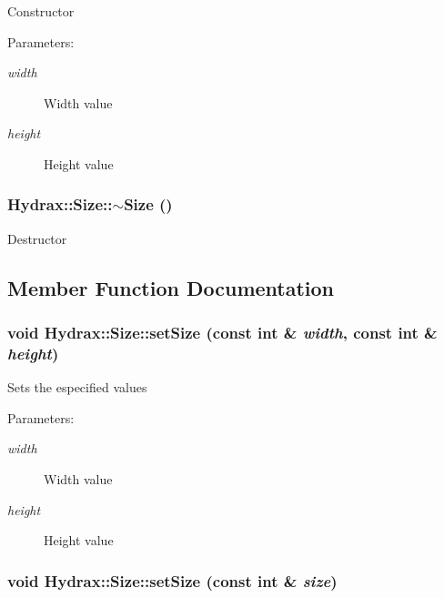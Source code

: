Constructor \begin{Desc}
\item[Parameters:]
\begin{description}
\item[{\em width}]Width value \item[{\em height}]Height value \end{description}
\end{Desc}
\hypertarget{struct_hydrax_1_1_size_ace8e593f9b2c5f6672f401ba86a2df9}{
\subsubsection[{$\sim$Size}]{\setlength{\rightskip}{0pt plus 5cm}Hydrax::Size::$\sim$Size ()}}
\label{struct_hydrax_1_1_size_ace8e593f9b2c5f6672f401ba86a2df9}


Destructor 

\subsection{Member Function Documentation}
\hypertarget{struct_hydrax_1_1_size_a8ab07e13e4931f071f6af2161728168}{
\subsubsection[{setSize}]{\setlength{\rightskip}{0pt plus 5cm}void Hydrax::Size::setSize (const int \& {\em width}, \/  const int \& {\em height})}}
\label{struct_hydrax_1_1_size_a8ab07e13e4931f071f6af2161728168}


Sets the especified values \begin{Desc}
\item[Parameters:]
\begin{description}
\item[{\em width}]Width value \item[{\em height}]Height value \end{description}
\end{Desc}
\hypertarget{struct_hydrax_1_1_size_ed24a854ee32305fda00bd0c41fa2d0a}{
\subsubsection[{setSize}]{\setlength{\rightskip}{0pt plus 5cm}void Hydrax::Size::setSize (const int \& {\em size})}}
\label{struct_hydrax_1_1_size_ed24a854ee32305fda00bd0c41fa2d0a}


